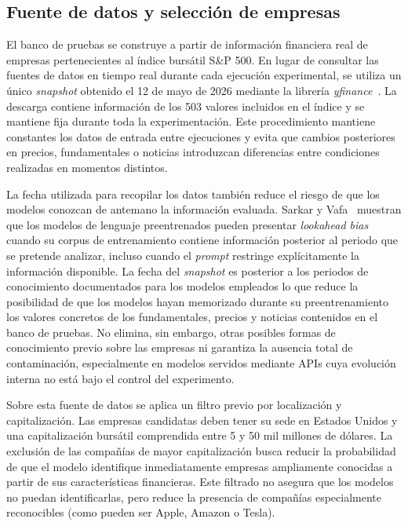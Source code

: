 \subsection{Fuente de datos y selección de empresas}
\label{subsec:fuente_datos}

El banco de pruebas se construye a partir de información financiera real de empresas pertenecientes al índice bursátil S\&P 500. En lugar de consultar las fuentes de datos en tiempo real durante cada ejecución experimental, se utiliza un único \textit{snapshot} obtenido el 12 de mayo de 2026 mediante la librería \textit{yfinance}~\cite{yfinance}. La descarga contiene información de los 503 valores incluidos en el índice y se mantiene fija durante toda la experimentación. Este procedimiento mantiene constantes los datos de entrada entre ejecuciones y evita que cambios posteriores en precios, fundamentales o noticias introduzcan diferencias entre condiciones realizadas en momentos distintos.

La fecha utilizada para recopilar los datos también reduce el riesgo de que los modelos conozcan de antemano la información evaluada. Sarkar y Vafa~\cite{sarkar2024lookahead} muestran que los modelos de lenguaje preentrenados pueden presentar \textit{lookahead bias} cuando su corpus de entrenamiento contiene información posterior al periodo que se pretende analizar, incluso cuando el \textit{prompt} restringe explícitamente la información disponible. La fecha del \textit{snapshot} es posterior a los periodos de conocimiento documentados para los modelos empleados lo que reduce la posibilidad de que los modelos hayan memorizado durante su preentrenamiento los valores concretos de los fundamentales, precios y noticias contenidos en el banco de pruebas. No elimina, sin embargo, otras posibles formas de conocimiento previo sobre las empresas ni garantiza la ausencia total de contaminación, especialmente en modelos servidos mediante APIs cuya evolución interna no está bajo el control del experimento.

Sobre esta fuente de datos se aplica un filtro previo por localización y capitalización. Las empresas candidatas deben tener su sede en Estados Unidos y una capitalización bursátil comprendida entre 5 y 50 mil millones de dólares. La exclusión de las compañías de mayor capitalización busca reducir la probabilidad de que el modelo identifique inmediatamente empresas ampliamente conocidas a partir de sus características financieras. Este filtrado no asegura que los modelos no puedan identificarlas, pero reduce la presencia de compañías especialmente reconocibles (como pueden ser Apple, Amazon o Tesla).

